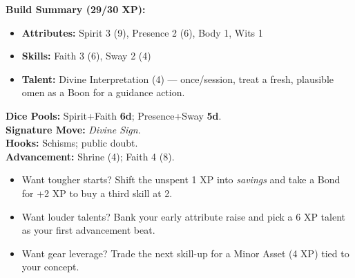 \begin{multicols}{2}
\textbf{Build Summary (29/30 XP):}
\begin{itemize}
  \item \textbf{Attributes:} Spirit 3 (9), Presence 2 (6), Body 1, Wits 1
  \item \textbf{Skills:} Faith 3 (6), Sway 2 (4)
  \item \textbf{Talent:} Divine Interpretation (4) — once/session, treat a fresh, plausible omen as a Boon for a guidance action.
\end{itemize}
\textbf{Dice Pools:} Spirit+Faith \textbf{6d}; Presence+Sway \textbf{5d}.\\
\textbf{Signature Move:} \emph{Divine Sign}.\\
\textbf{Hooks:} Schisms; public doubt.\\
\textbf{Advancement:} Shrine (4); Faith 4 (8).

\begin{tcolorbox}[colback=green!5!white,colframe=green!60!black,title=Quick Conversion, fonttitle=\bfseries]
\begin{itemize}
  \item Want tougher starts? Shift the unspent 1 XP into \emph{savings} and take a Bond for +2 XP to buy a third skill at 2.
  \item Want louder talents? Bank your early attribute raise and pick a 6 XP talent as your first advancement beat.
  \item Want gear leverage? Trade the next skill-up for a Minor Asset (4 XP) tied to your concept.
\end{itemize}
\end{tcolorbox}

\end{multicols}

